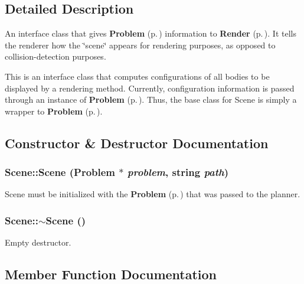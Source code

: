 \subsection{Detailed Description}
An interface class that gives {\bf Problem} {\rm (p.\,\pageref{class_Problem})} information to {\bf Render} {\rm (p.\,\pageref{class_Render})}. It tells the renderer how the \char`\"{}scene\char`\"{} appears for rendering purposes, as opposed to collision-detection purposes.

This is an interface class that computes configurations of all bodies to be displayed by a rendering method. Currently, configuration information is passed through an instance of {\bf Problem} {\rm (p.\,\pageref{class_Problem})}. Thus, the base class for Scene is simply a wrapper to {\bf Problem} {\rm (p.\,\pageref{class_Problem})}. 



\subsection{Constructor \& Destructor Documentation}
\subsubsection{\setlength{\rightskip}{0pt plus 5cm}Scene::Scene ({\bf Problem} $\ast$ {\em problem}, string {\em path})}\label{class_Scene_a0}


Scene must be initialized with the {\bf Problem} {\rm (p.\,\pageref{class_Problem})} that was passed to the planner.

\subsubsection{\setlength{\rightskip}{0pt plus 5cm}Scene::$\sim$Scene ()\hspace{0.3cm}{\tt  [inline, virtual]}}\label{class_Scene_a1}


Empty destructor.



\subsection{Member Function Documentation}

